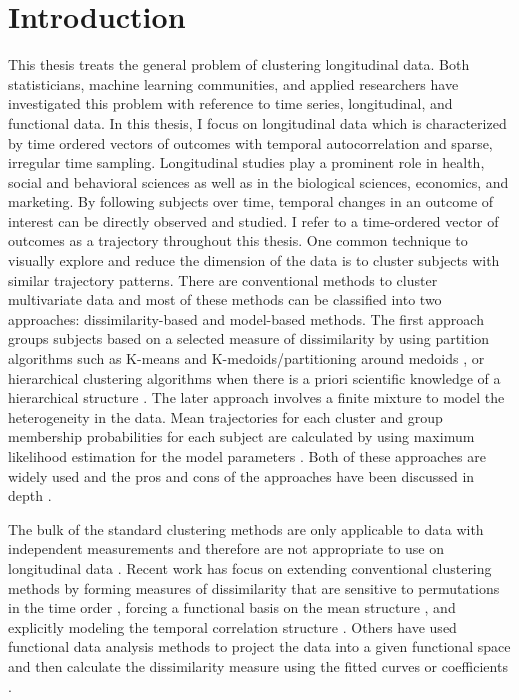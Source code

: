 \chapter{Introduction}

This thesis treats the general problem of clustering longitudinal data. Both statisticians, machine learning communities, and applied researchers have investigated this problem with reference to time series, longitudinal, and functional data. In this thesis, I focus on longitudinal data which is characterized by time ordered vectors of outcomes with temporal autocorrelation and sparse, irregular time sampling. Longitudinal studies play a prominent role in health, social and behavioral sciences as well as in the biological sciences, economics, and marketing. By following subjects over time, temporal changes in an outcome of interest can be directly observed and studied. I refer to a time-ordered vector of outcomes as a trajectory throughout this thesis. One common technique to visually explore and reduce the dimension of the data is to cluster subjects with similar trajectory patterns. There are conventional methods to cluster multivariate data and most of these methods can be classified into two approaches: dissimilarity-based and model-based methods. The first approach groups subjects based on a selected measure of dissimilarity by using partition algorithms such as K-means \cite{macqueen1967, hartigan1979} and K-medoids/partitioning around medoids \cite{kaufman1990}, or hierarchical clustering algorithms when there is a priori scientific knowledge of a hierarchical structure \cite{murtagh1983}. The later approach involves a finite mixture to model the heterogeneity in the data. Mean trajectories for each cluster and group membership probabilities for each subject are calculated by using maximum likelihood estimation for the model parameters \cite{mclachlan1988,mclachlan2000,everitt1981}. Both of these approaches are widely used and the pros and cons of the approaches have been discussed in depth \cite{magidson2002, everitt1981}.

The bulk of the standard clustering methods are only applicable to data with independent measurements and therefore are not appropriate to use on longitudinal data \cite{everitt2009}. Recent work has focus on extending conventional clustering methods by forming measures of dissimilarity that are sensitive to permutations in the time order \cite{chouakria2007}, forcing a functional basis on the mean structure \cite{nagin1999,gaffney1999}, and explicitly modeling the temporal correlation structure \cite{muthen1999,fraley1999,mcnicholas2010}. Others have used functional data analysis methods \cite{ramsay2002,ramsay2005} to project the data into a given functional space and then calculate the dissimilarity measure using the fitted curves or coefficients \cite{serban2005, tarpey2003, abraham2003, tarpey2007,hitchcock2007}.

